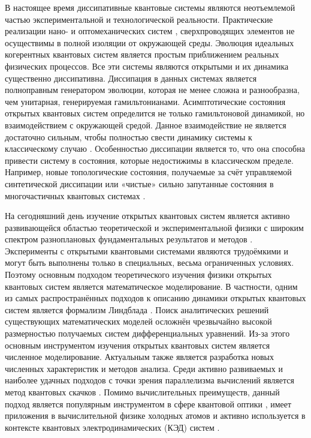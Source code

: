 
{\actuality} 
В настоящее время диссипативные квантовые системы являются неотъемлемой частью экспериментальной и технологической реальности.
Практические реализации нано- \autocite{Poot2012} и оптомеханических систем \autocite{Aspelmeyer2014}, сверхпроводящих элементов \autocite{Clarke2008} не осуществимы в полной изоляции от окружающей среды.
Эволюция идеальных когерентных квантовых систем является простым приближением реальных физических процессов. 
Все эти системы являются открытыми и их динамика существенно диссипативна.
Диссипация в данных системах является полноправным генератором эволюции, которая не менее сложна и разнообразна, чем унитарная, генерируемая гамильтонианами.
Асимптотические состояния открытых квантовых систем определится не только гамильтоновой динамикой, но взаимодействием с окружающей средой.
Данное взаимодействие не является достаточно сильным, чтобы полностью свести динамику системы к классическому случаю \autocite{Breuer2007}.
Особенностью диссипации является то, что она способна привести систему в состояния, которые недостижимы в классическом пределе.
Например, новые топологические состояния, получаемые за счёт управляемой синтетической диссипации \autocite{Diehl2011} или «чистые» сильно запутанные состояния в многочастичных квантовых системах \autocite{Kraus2008}.

На сегодняшний день изучение открытых квантовых систем является активно развивающейся областью теоретической и экспериментальной физики с широким спектром разноплановых фундаментальных результатов и методов \autocite{Breuer2007}.
Эксперименты с открытыми квантовыми системами являются трудоёмкими и могут быть выполнены только в специальных, весьма ограниченных условиях.
Поэтому основным подходом теоретического изучения физики открытых квантовых систем является математическое моделирование.
В частности, одним из самых распространённых подходов к описанию динамики открытых квантовых систем является формализм Линдблада \autocite{Lindblad1976, Gorini1976}.
Поиск аналитических решений существующих математических моделей осложнён чрезвычайно высокой размерностью получаемых систем дифференциальных уравнений.
Из-за этого основным инструментом изучения открытых квантовых систем является численное моделирование.
Актуальным также является разработка новых численных характеристик и методов анализа.
Среди активно развиваемых и наиболее удачных подходов с точки зрения параллелизма вычислений является метод квантовых скачков \autocite{Dalibard1992, Dum1992, Plenio1998}.
Помимо вычислительных преимуществ, данный подход является популярным инструментом в сфере квантовой оптики \autocite{Carmichael1993}, имеет приложения в вычислительной физике холодных атомов \autocite{Diehl2011, Diehl2008, Marcuzzi2014} и активно используется в контексте квантовых электродинамических (КЭД) систем \autocite{Imamoglu1999, Walther2006, Arakawa2015}.

